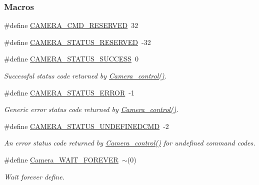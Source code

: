 \subsubsection*{Macros}
\begin{DoxyCompactItemize}
\item 
\#define \hyperlink{_camera_8h_aed2b3df48a75ec7e6e78320bb3a48eb9}{C\+A\+M\+E\+R\+A\+\_\+\+C\+M\+D\+\_\+\+R\+E\+S\+E\+R\+V\+E\+D}~32
\item 
\#define \hyperlink{_camera_8h_a13b3728d2673d72db6cc71744a0cbedf}{C\+A\+M\+E\+R\+A\+\_\+\+S\+T\+A\+T\+U\+S\+\_\+\+R\+E\+S\+E\+R\+V\+E\+D}~-\/32
\item 
\#define \hyperlink{_camera_8h_aa4d73b4da4ce113c8fb545d1f2649257}{C\+A\+M\+E\+R\+A\+\_\+\+S\+T\+A\+T\+U\+S\+\_\+\+S\+U\+C\+C\+E\+S\+S}~0
\begin{DoxyCompactList}\small\item\em Successful status code returned by \hyperlink{_camera_8h_adfc7e9a60daa499220296a238a09b393}{Camera\+\_\+control()}. \end{DoxyCompactList}\item 
\#define \hyperlink{_camera_8h_a2863402eca66d26cf447fc02340a0d45}{C\+A\+M\+E\+R\+A\+\_\+\+S\+T\+A\+T\+U\+S\+\_\+\+E\+R\+R\+O\+R}~-\/1
\begin{DoxyCompactList}\small\item\em Generic error status code returned by \hyperlink{_camera_8h_adfc7e9a60daa499220296a238a09b393}{Camera\+\_\+control()}. \end{DoxyCompactList}\item 
\#define \hyperlink{_camera_8h_aae8cae4253d68cc8ae921b63a74d1cb9}{C\+A\+M\+E\+R\+A\+\_\+\+S\+T\+A\+T\+U\+S\+\_\+\+U\+N\+D\+E\+F\+I\+N\+E\+D\+C\+M\+D}~-\/2
\begin{DoxyCompactList}\small\item\em An error status code returned by \hyperlink{_camera_8h_adfc7e9a60daa499220296a238a09b393}{Camera\+\_\+control()} for undefined command codes. \end{DoxyCompactList}\item 
\#define \hyperlink{_camera_8h_a1b85e579e68cecb09d1e2be70a6c56a9}{Camera\+\_\+\+W\+A\+I\+T\+\_\+\+F\+O\+R\+E\+V\+E\+R}~$\sim$(0)
\begin{DoxyCompactList}\small\item\em Wait forever define. \end{DoxyCompactList}\end{DoxyCompactItemize}
